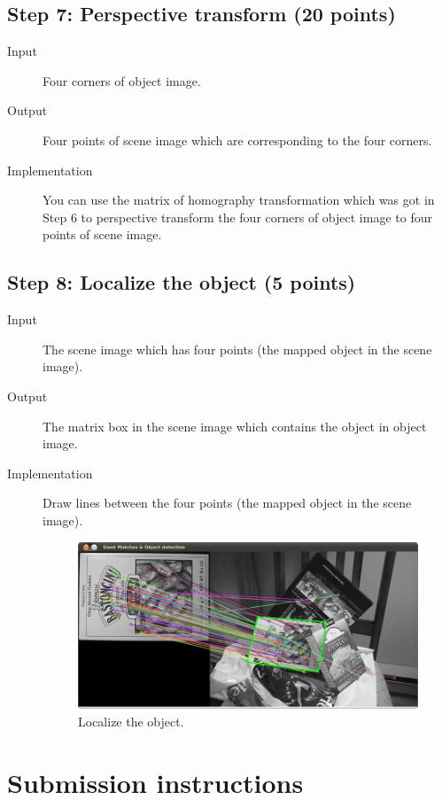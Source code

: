 \documentclass[12pt]{article}
\begin{document}
\subsection{Step 7: Perspective transform (20 points)}

\begin{description}
\item[Input] Four corners of object image.
\item[Output] Four points of scene image which are corresponding to the four corners.
\item[Implementation] You can use the matrix of homography transformation which was got in Step 6 to perspective transform the four corners of object image to four points of scene image.
\end{description}

\subsection{Step 8: Localize the object (5 points)}

\begin{description}
\item[Input] The scene image which has four points (the mapped object in the scene image).
\item[Output] The matrix box in the scene image which contains the object in object image.
\item[Implementation] Draw lines between the four points (the mapped object in the scene image).
\begin{figure}[!ht]
\centering
\includegraphics[height=0.3\textheight]{Result.jpg}
\caption{Localize the object.}
\label{fig:localize}
\end{figure}
\end{description}


\section{Submission instructions}
\end{document}
